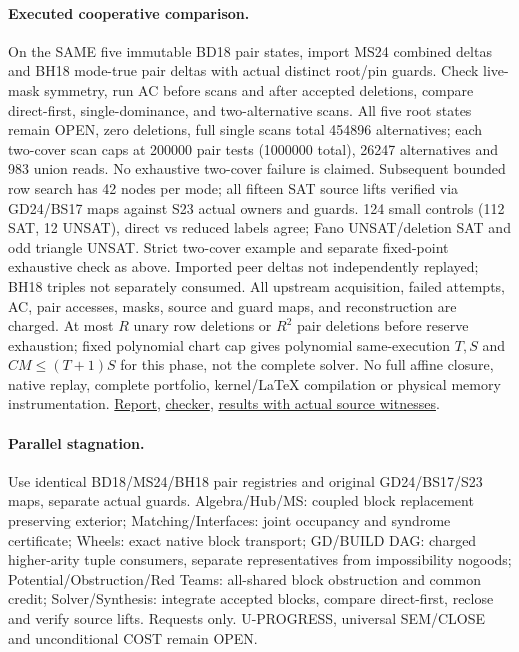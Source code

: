 \documentclass[11pt]{article}
\begin{document}
\paragraph{Executed cooperative comparison.}
On the SAME five immutable BD18 pair states, import MS24 combined deltas and BH18 mode-true pair deltas with actual distinct root/pin guards. Check live-mask symmetry, run AC before scans and after accepted deletions, compare direct-first, single-dominance, and two-alternative scans. All five root states remain OPEN, zero deletions, full single scans total 454896 alternatives; each two-cover scan caps at 200000 pair tests (1000000 total), 26247 alternatives and 983 union reads. No exhaustive two-cover failure is claimed. Subsequent bounded row search has 42 nodes per mode; all fifteen SAT source lifts verified via GD24/BS17 maps against S23 actual owners and guards. 124 small controls (112 SAT, 12 UNSAT), direct vs reduced labels agree; Fano UNSAT/deletion SAT and odd triangle UNSAT. Strict two-cover example and separate fixed-point exhaustive check as above. Imported peer deltas not independently replayed; BH18 triples not separately consumed. All upstream acquisition, failed attempts, AC, pair accesses, masks, source and guard maps, and reconstruction are charged. At most $R$ unary row deletions or $R^2$ pair deletions before reserve exhaustion; fixed polynomial chart cap gives polynomial same-execution $T,S$ and $CM\le(T+1)S$ for this phase, not the complete solver. No full affine closure, native replay, complete portfolio, kernel/LaTeX compilation or physical memory instrumentation. \href{https://github.com/j15marti/pnp/commit/053b046be4fc59e40030d4afe6e621d97c74ddaf}{Report}, \href{https://github.com/j15marti/pnp/commit/9cce78a45624abd4c796e9d41c20827c6c7a66fa}{checker}, \href{https://github.com/j15marti/pnp/commit/f09d79ee4e62a8a34930a826cd2c9d731f1d5cc6}{results with actual source witnesses}.
\paragraph{Parallel stagnation.}
Use identical BD18/MS24/BH18 pair registries and original GD24/BS17/S23 maps, separate actual guards. Algebra/Hub/MS: coupled block replacement preserving exterior; Matching/Interfaces: joint occupancy and syndrome certificate; Wheels: exact native block transport; GD/BUILD DAG: charged higher-arity tuple consumers, separate representatives from impossibility nogoods; Potential/Obstruction/Red Teams: all-shared block obstruction and common credit; Solver/Synthesis: integrate accepted blocks, compare direct-first, reclose and verify source lifts. Requests only. U-PROGRESS, universal SEM/CLOSE and unconditional COST remain OPEN.
\end{document}
